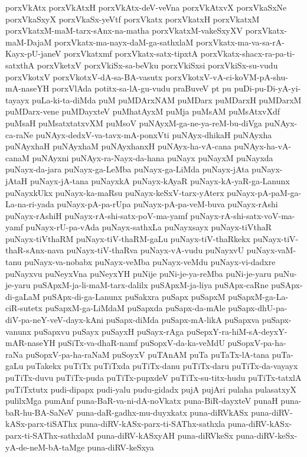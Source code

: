 {porxVkAtx
porxVkAtxH
porxVkAtx-deV-veVna
porxVkAtxvX
porxVkaSxNe
porxVkaSxyX
porxVkaSx-yeVtf
porxVkatx
porxVkatxH
porxVkatxM
porxVkatxM-maM-tarx-sAnx-na-matha
porxVkatxM-vakeSxyXV
porxVkatx-maM-DajaM
porxVkatx-ma-nayx-daM-ga-sathxlaM
porxVkatx-ma-va-sa-rA-Kayx-pU-janeV
porxVkatxmf
porxVkatx-satx-tipxtA
porxVkatx-shacx-ra-pa-ti-satxthA
porxVketxV
porxVkiSx-sa-beVku
porxVkiSxsi
porxVkiSx-su-vudu
porxVkotxV
porxVkotxV-dA-sa-BA-vasutx
porxVkotxV-vA-ci-koVM-pA-shu-mA-naseYH
porxVlAda
potitx-sa-lA-gu-vudu
praBuveV
pt
pu
puDi-pu-Di-yA-yi-tayayx
puLa-ki-ta-diMda
puM
puMDArxNAM
puMDarx
puMDarxH
puMDarxM
puMDarx-vene
puMDayxteV
puMhatAyxM
puMja
puMsAM
puMsAtxvXdf
puMsaH
puMsatxtatxvXM
puMsoV
puNAyxM-ga-ne-ya-reM-bu-diVga
puNAyx-ca-raNe
puNAyx-dedxV-va-tavx-mA-ponxVti
puNAyx-dhikaH
puNAyxha
puNAyxhaH
puNAyxhaM
puNAyxhanxH
puNAyx-ha-vA-cana
puNAyx-ha-vA-canaM
puNAyxni
puNAyx-ra-Nayx-da-hana
puNayx
puNayxM
puNayxda
puNayx-da-jara
puNayx-ga-LeMba
puNayx-ga-LiMda
puNayx-jAta
puNayx-jAtaH
puNayx-jA-tana
puNayxkA
puNayx-kAyaR
puNayx-kA-yaR-ga-Lanunx
puNayxkUkx
puNayx-ka-maRsu
puNayx-keSxV-tarx-yAterx
puNayx-pA-paM-ga-La-na-ri-yada
puNayx-pA-pa-rUpa
puNayx-pA-pa-veM-buva
puNayx-rAshi
puNayx-rAshiH
puNayx-rA-shi-satx-poV-ma-yamf
puNayx-rA-shi-satx-voV-ma-yamf
puNayx-rU-pa-vAda
puNayx-sathxLa
puNayxsayx
puNayx-tiVthaR
puNayx-tiVthaRM
puNayx-tiV-thaRM-gaLu
puNayx-tiV-thaRkekx
puNayx-tiV-thaR-sAnx-nava
puNayx-tiV-thaRva
puNayx-vA-vudu
puNayxvU
puNayx-vaM-tanu
puNayx-va-nobabx
puNayx-veMba
puNayx-veMdu
puNayx-vi-dadxre
puNayxvu
puNeyxVna
puNeyxYH
puNije
puNi-je-ya-reMba
puNi-je-yaru
puNu-je-yaru
puSApxM-ja-li-maM-tarx-dalilx
puSApxM-ja-liya
puSApx-caRne
puSApx-di-gaLaM
puSApx-di-ga-Lanunx
puSakxra
puSapx
puSapxM
puSapxM-ga-La-ciR-sutetx
puSapxM-ga-LiMdaM
puSapxda
puSapx-da-mAle
puSapx-dhU-pa-diV-pa-neY-veV-dayx-kAni
puSapx-diMda
puSapx-mA-likA
puSapxva
puSapx-vanunx
puSapxvu
puSayx
puSayxH
puSayx-rAga
puSepxY-ra-hiM-sA-deyxY-mAR-naseYH
puSiTx-va-dhaR-namf
puSopxV-da-ka-veMdU
puSopxV-pa-ha-raNa
puSopxV-pa-ha-raNaM
puSoyxV
puTAnAM
puTa
puTaTx-lA-tana
puTa-gaLu
puTakekx
puTiTx
puTiTxda
puTiTx-danu
puTiTx-daru
puTiTx-da-vayayx
puTiTx-duvu
puTiTx-puda
puTiTx-pupxdeV
puTiTx-su-titx-hudu
puTiTx-tatxlA
puTiTxtutx
pudi-dipapx
pudi-yalu
pudu-gidadx
pujA
pujAri
pulaha
pulasatxyX
pulilxMga
pumAnf
puna-BaR-va-ni-dA-noVkatx
puna-BiR-dayxteV
punaH
puna-baR-hu-BA-SaNeV
puna-daR-gadhx-mu-duyxkatx
puna-diRVkASx
puna-diRV-kASx-parx-tiSAThx
puna-diRV-kASx-parx-ti-SAThx-sathxla
puna-diRV-kASx-parx-ti-SAThx-sathxlaM
puna-diRV-kASxyAH
puna-diRVkeSx
puna-diRV-keSx-yA-de-neM-bA-taMge
puna-diRV-keSxya
}
